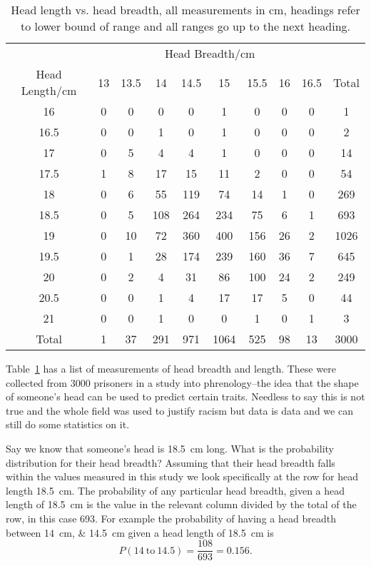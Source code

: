    \begin{example}
        \begin{table}[ht]
            \centering
            \begin{tabular}{ccccccccc|c}
                &\multicolumn{8}{c}{Head Breadth/\si{\centi\metre}}&\\
                Head Length/\si{\centi\metre} & 13 & 13.5 & 14 & 14.5 & 15  & 15.5 & 16 & 16.5 & Total\\
                16    & 0 & 0 & 0 & 0 & 1 & 0 & 0 & 0 & 1\\
                16.5  & 0 & 0 & 1 & 0 & 1 & 0 & 0 & 0 & 2\\
                17    & 0 & 5 & 4 & 4 & 1 & 0 & 0 & 0 & 14\\
                17.5  & 1 & 8 & 17 & 15 & 11 & 2 & 0 & 0 & 54\\
                18    & 0 & 6 & 55 & 119 & 74 & 14 & 1 & 0 &269\\
                \rowcolor{lightgray}
                18.5  & 0 & 5 & 108 & 264 & 234 & 75 & 6 & 1 & 693\\
                19    & 0 & 10 & 72 & 360 & 400 & 156 & 26 & 2 & 1026\\
                19.5  & 0 & 1 & 28 & 174 & 239 & 160 & 36 & 7 & 645\\
                20    & 0 & 2 & 4 & 31 & 86 & 100 & 24 & 2 & 249\\
                20.5  & 0 & 0 & 1 & 4 & 17 & 17 & 5 & 0 & 44\\
                21    & 0 & 0 & 1 & 0 & 0 & 1 & 0 & 1 & 3\\\hline
                Total & 1 & 37 & 291 & 971 & 1064 & 525 & 98 & 13 & 3000
            \end{tabular}
            \caption{Head length vs. head breadth, all measurements in \si{\centi\metre}, headings refer to lower bound of range and all ranges go up to the next heading.}
            \label{tab:head measurements}
        \end{table}
        Table~\ref{tab:head measurements} has a list of measurements of head breadth and length.
        These were collected from 3000 prisoners in a study into phrenology--the idea that the shape of someone's head can be used to predict certain traits.
        Needless to say this is not true and the whole field was used to justify racism but data is data and we can still do some statistics on it.
        
        Say we know that someone's head is \SI{18.5}{\centi\metre} long.
        What is the probability distribution for their head breadth?
        Assuming that their head breadth falls within the values measured in this study we look specifically at the row for head length \SI{18.5}{\centi\metre}.
        The probability of any particular head breadth, given a head length of \SI{18.5}{\centi\metre} is the value in the relevant column divided by the total of the row, in this case 693.
        For example the probability of having a head breadth between \SIlist{14;14.5}{\centi\metre} given a head length of \SI{18.5}{\centi\metre} is
        \[P(14~\text{to}~14.5) = \frac{108}{693} = 0.156.\]
    \end{example}
